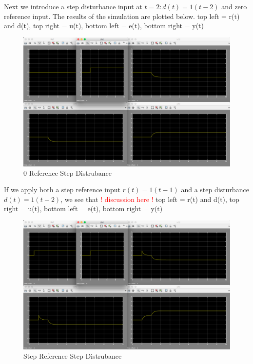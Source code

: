 \documentclass[10pt,titlepage]{article}
\begin{document}
		Next we introduce a step disturbance input at $t=2: d(t)=1(t-2)$ and zero reference input. The results of the simulation are plotted below. top left = r(t) and d(t), top right = u(t), bottom left = e(t), bottom right = y(t)
		\begin{figure}[H]
			\centering
			\includegraphics[scale=0.3]{e6-2}
			\caption{0 Reference Step Distrubance}
		\end{figure}	
		
		If we apply both a step reference input $r(t)=1(t-1)$ and a step disturbance $d(t)=1(t-2)$, we see that \textcolor{red}{! discussion here !}
		top left = r(t) and d(t), top right = u(t), bottom left = e(t), bottom right = y(t)
		\begin{figure}[H]
			\centering
			\includegraphics[scale=0.3]{e6-3}
			\caption{Step Reference Step Distrubance}
		\end{figure}
		
\end{document}
